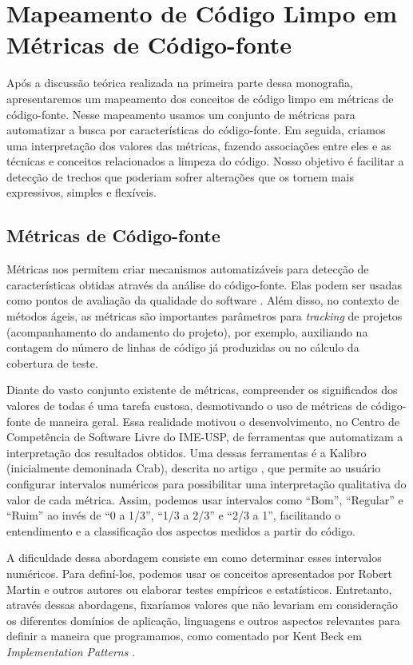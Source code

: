 \chapter{Mapeamento de Código Limpo em Métricas de Código-fonte}
\label{chap:mapeamento}	

Após a discussão teórica realizada na primeira parte dessa 	monografia, apresentaremos um mapeamento dos conceitos de código limpo em métricas de código-fonte. Nesse mapeamento usamos um conjunto de métricas para automatizar a busca por características do código-fonte. Em seguida, criamos uma interpretação dos valores das métricas, fazendo associações entre eles e as técnicas e conceitos relacionados a limpeza do código. Nosso objetivo é facilitar a detecção de trechos que poderiam sofrer alterações que os tornem mais expressivos, simples e flexíveis.


\section{Métricas de Código-fonte}

Métricas nos permitem criar mecanismos automatizáveis para detecção de características obtidas através da análise do código-fonte. Elas podem ser usadas como pontos de avaliação da qualidade do software \citep{meirelles:sbqs09}. Além disso, no contexto de métodos ágeis, as métricas são importantes parâmetros para \textit{tracking} de projetos (acompanhamento do andamento do projeto), por exemplo, auxiliando na contagem do número de linhas de código já produzidas ou no cálculo da cobertura de teste.	

Diante do vasto conjunto existente de métricas, compreender os significados dos valores de todas é uma tarefa custosa, desmotivando o uso de métricas de código-fonte de maneira geral. Essa realidade motivou o desenvolvimento, no Centro de Competência de Software Livre do IME-USP, de ferramentas que automatizam a interpretação dos resultados obtidos. Uma dessas ferramentas é a Kalibro (inicialmente demoninada Crab), descrita no artigo \citep{meirelles:sbes09}, que permite ao usuário configurar intervalos numéricos para possibilitar uma interpretação qualitativa do valor de cada métrica. Assim, podemos usar intervalos como ``Bom'', ``Regular'' e ``Ruim'' ao invés de ``0 a 1/3'', ``1/3 a 2/3'' e ``2/3 a 1'', facilitando o entendimento e a classificação dos aspectos medidos a partir do código.
                                        
A dificuldade dessa abordagem consiste em como determinar esses intervalos numéricos. Para definí-los, podemos usar os conceitos apresentados por Robert Martin \citep{Martin2008} e outros autores ou elaborar testes empíricos e estatísticos. Entretanto, através dessas abordagens, fixaríamos valores que não levariam em consideração os diferentes domínios de aplicação, linguagens e outros aspectos relevantes para definir a maneira que programamos, como comentado por Kent Beck em \textit{Implementation Patterns} \citep{Beck2007}.                           
                                                         
